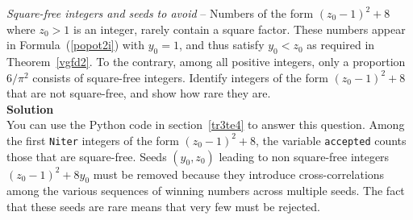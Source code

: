 \documentclass[oneside,10pt]{book}
\begin{document}
\begin{Exercise}\label{knoy54} {\em Square-free integers and seeds to avoid} -- Numbers of the form $(z_0-1)^2 +8$ where $z_0>1$ is an integer, rarely contain a square factor. These numbers  appear in Formula~(\ref{popot2i}) with $y_0=1$, and thus satisfy $y_0 < z_0$
 as required in Theorem~\ref{vgfd2}. To the contrary, among all positive integers, only a proportion $6/\pi^2$ consists of square-free
 integers. Identify integers of the form $(z_0-1)^2 +8$ that are not square-free, and show how rare they are. \vspace{1ex} \\
{\bf Solution} \\
 You can use the Python code in section~\ref{tr3te4} to answer this question. Among the first \texttt{Niter} integers of the form
 $(z_0-1)^2 +8$, the variable \texttt{accepted} counts those that are square-free. Seeds $(y_0,z_0)$ leading to non square-free integers $(z_0-1)^2 +8y_0$ must be removed because they introduce cross-correlations among the various sequences of winning numbers across multiple seeds. The fact that these seeds are rare means that very few must be rejected.
\end{Exercise}
\end{document}
